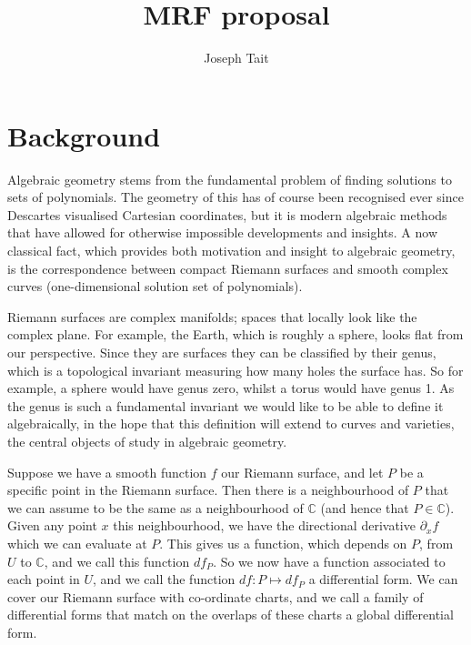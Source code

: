 \documentclass[draft, 11pt, notitlepage]{article} %
\title{MRF proposal}
\author{Joseph Tait}
\theoremstyle{plain}
\theoremstyle{remark}
\begin{document}
\maketitle
\thispagestyle{empty}



\section{Background}

Algebraic geometry stems from the fundamental problem of finding solutions to sets of polynomials.
The geometry of this has of course been recognised ever since Descartes visualised Cartesian coordinates, but it is modern algebraic methods that have allowed for otherwise impossible developments and insights.
A now classical fact, which provides both motivation and insight to algebraic geometry,  is the correspondence between compact Riemann surfaces and smooth complex curves (one-dimensional solution set of polynomials).

Riemann surfaces are complex manifolds; spaces that locally look like the complex plane. For example, the Earth, which is roughly a sphere, looks flat from our perspective.
Since they are surfaces they can be classified by their genus, which is a topological invariant measuring how many holes the surface has.
So for example, a sphere would have genus zero, whilst a torus would have genus 1.
As the genus is such a fundamental invariant we would like to be able to define it algebraically, in the hope that this definition will extend to curves and varieties, the central objects of study in algebraic geometry.

Suppose we have a smooth function $f$ our Riemann surface, and let $P$ be a specific point in the Riemann surface.
Then there is a neighbourhood of $P$ that we can assume to be the same as a neighbourhood of $\mathbb C$ (and hence that $P \in \mathbb C$).
Given any point $x$ this neighbourhood, we have the directional derivative $\partial_x f$ which we can evaluate at $P$.
This gives us a function, which depends on $P$, from $U$ to $\mathbb C$, and we call this function $df_P$.
So we now have a function associated to each point in $U$, and we call the function $df: P \mapsto df_P$ a differential form.
We can cover our Riemann surface with co-ordinate charts, and we call a family of differential forms that match on the overlaps of these charts a global differential form.
\end{document}
